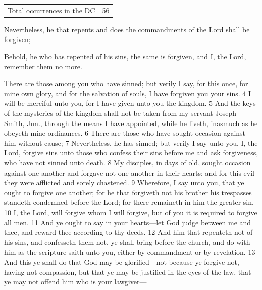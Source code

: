 		\begin{tabular}{ll}
			Total occurrences in the DC & 56
		\end{tabular}
		
		\begin{compactdesc}
			\item[{\hyperref[DC1-32]{DC 1:32}}] Nevertheless, he that repents and does the commandments of the Lord shall be forgiven;
			\item[{\hyperref[DC42-25]{DC 42:25--26}}]
			\item[{\hyperref[DC58-42]{DC 58:42}}] Behold, he who has repented of his sins, the same is forgiven, and I, the Lord, remember them no more.
			\item[{\hyperref[DC60-7]{DC 60:7}}] 
			\item[{\hyperref[DC61-2]{DC 61:2}}]
			\item[{\hyperref[DC64-3]{DC 64:3--13}}] There are those among you who have sinned; but verily I say, for this once, for mine own glory, and for the salvation of souls, I have forgiven you your sins. 4 I will be merciful unto you, for I have given unto you the kingdom. 5 And the keys of the mysteries of the kingdom shall not be taken from my servant Joseph Smith, Jun., through the means I have appointed, while he liveth, inasmuch as he obeyeth mine ordinances. 6 There are those who have sought occasion against him without cause; 7 Nevertheless, he has sinned; but verily I say unto you, I, the Lord, forgive sins unto those who confess their sins before me and ask forgiveness, who have not sinned unto death. 8 My disciples, in days of old, sought occasion against one another and forgave not one another in their hearts; and for this evil they were afflicted and sorely chastened. 9 Wherefore, I say unto you, that ye ought to forgive one another; for he that forgiveth not his brother his trespasses standeth condemned before the Lord; for there remaineth in him the greater sin. 10 I, the Lord, will forgive whom I will forgive, but of you it is required to forgive all men. 11 And ye ought to say in your hearts---let God judge between me and thee, and reward thee according to thy deeds. 12 And him that repenteth not of his sins, and confesseth them not, ye shall bring before the church, and do with him as the scripture saith unto you, either by commandment or by revelation. 13 And this ye shall do that God may be glorified---not because ye forgive not, having not compassion, but that ye may be justified in the eyes of the law, that ye may not offend him who is your lawgiver---
				\begin{compactitem}

\end{compactitem}
\end{compactdesc}
